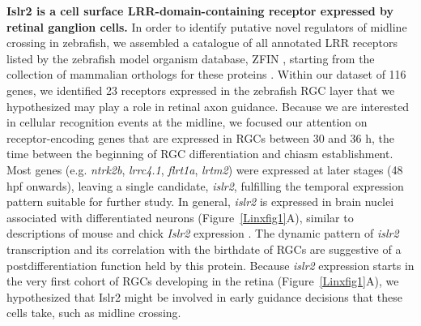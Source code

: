 \textbf{Islr2 is a cell surface LRR-domain-containing receptor expressed by retinal ganglion cells.}\newline
In order to identify putative novel regulators of midline crossing in zebrafish, we assembled a catalogue of all annotated LRR receptors listed by the zebrafish model organism database, ZFIN \cite{bradford2011zfin}, starting from the collection of mammalian orthologs for these proteins \cite{dolan2007extracellular}.
Within our dataset of 116 genes, we identified 23 receptors expressed in the zebrafish RGC layer that we hypothesized may play a role in retinal axon guidance.
Because we are interested in cellular recognition events at the midline, we focused our attention on receptor-encoding genes that are expressed in RGCs between 30 and 36 h, the time between the beginning of RGC differentiation and chiasm establishment.
Most genes (e.g. \emph{ntrk2b}, \emph{lrrc4.1}, \emph{flrt1a}, \emph{lrtm2}) were expressed at later stages (48 hpf onwards), leaving a single candidate, \emph{islr2}, fulfilling the temporal expression pattern suitable for further study.
In general, \emph{islr2} is expressed in brain nuclei associated with differentiated neurons (Figure~\ref{Linxfig1}A), similar to descriptions of mouse and chick \emph{Islr2} expression \cite{gejima2006lrr,homma2009expression}.
The dynamic pattern of \emph{islr2} transcription and its correlation with the birthdate of RGCs are suggestive of a postdifferentiation function held by this protein.
Because \emph{islr2} expression starts in the very first cohort of RGCs developing in the retina (Figure~\ref{Linxfig1}A), we hypothesized that Islr2 might be involved in early guidance decisions that these cells take, such as midline crossing.

